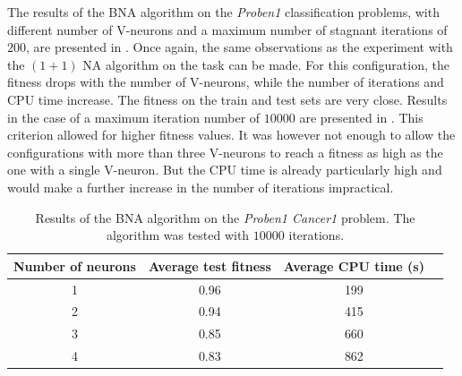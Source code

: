 The results of the BNA algorithm on the \textit{Proben1} classification problems, with different number of V-neurons and a maximum number of stagnant iterations of $200$, are presented
in . Once again, the same observations as the experiment with the $(1 + 1)$ NA algorithm on the task can be made. For this configuration,
the fitness drops with the number of V-neurons, while the number of iterations and CPU time increase. The fitness on the train and test sets are very close.
Results in the case of a maximum iteration number of $10000$ are presented in . This criterion allowed for higher fitness values. It was however not enough to allow
the configurations with more than three V-neurons to reach a fitness as high as the one with a single V-neuron. But the CPU time is already particularly high and would make
a further increase in the number of iterations impractical.

\begin{table}
    \caption{Results of the BNA algorithm on the \textit{Proben1 Cancer1} problem. The algorithm was tested with $10000$ iterations.}
    \centering
    \label{tab:bna_proben1}
    \begin{tabular}{ |c|c|c|c| }
        \hline
        Number of neurons & Average test fitness & Average CPU time (s) \\
        \hline
        1 & 0.96 & 199 \\
        \hline
        2 & 0.94 & 415 \\
        \hline
        3 & 0.85 & 660 \\
        \hline
        4 & 0.83 & 862 \\
        \hline\hline
    \end{tabular}
\end{table}

